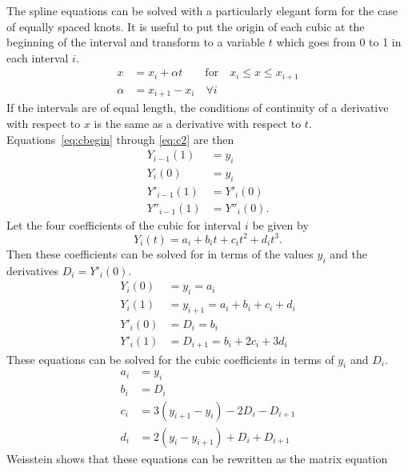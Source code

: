 \documentclass{scrartcl}
\begin{document}
The spline equations can be solved with a particularly elegant
form for the case of equally spaced knots. It is useful to put the
origin of each cubic at the beginning of the interval and transform
to a variable $t$ which goes from 0 to 1 in each interval $i$.
\begin{align}
x &= x_i + \alpha t \qquad\mbox{for}\quad x_i\leq x\leq x_{i+1}\label{eq:xt}\\
\alpha &= x_{i+1}-x_i \quad\forall i \label{eq:alpha}
\end{align}
If the
intervals are of equal length, the conditions of continuity
of a derivative with respect to $x$ is the same as a derivative
with respect to $t$. Equations~\ref{eq:cbegin} through \ref{eq:c2}
are then
\begin{align}
Y_{i-1}(1) &= y_i\\
Y_i(0) &= y_i\\
Y'_{i-1}(1) &= Y'_i(0)\\
Y''_{i-1}(1) &= Y''_i(0).
\end{align}
Let the four coefficients of the cubic for interval $i$ be given
by
\begin{equation}
Y_i(t) = a_i + b_i t + c_i t^2 + d_i t^3 .
\end{equation}
Then these coefficients can be solved for in terms of the
values $y_i$ and the derivatives $D_i = Y'_i(0)$.
\begin{align}
Y_i(0)&=y_i = a_i \label{eq:Yi0}\\
Y_i(1)&=y_{i+1} = a_i + b_i + c_i + d_i\\
Y'_i(0) &= D_i = b_i\\
Y'_i(1) &= D_{i+1} = b_i + 2 c_i + 3 d_i \label{eq:Ypi1}
\end{align}
These equations can be solved for the cubic coefficients in
terms of $y_i$ and $D_i$.
\begin{align}
a_i &= y_i \label{eq:ai}\\
b_i &= D_i\\
c_i &= 3(y_{i+1}-y_i)-2D_i-D_{i+1} \label{eq:ci}\\
d_i &= 2(y_i-y_{i+1})+D_i +D_{i+1} \label{eq:di}
\end{align}
Weisstein shows that these equations can be rewritten as
the matrix equation
\end{document}
